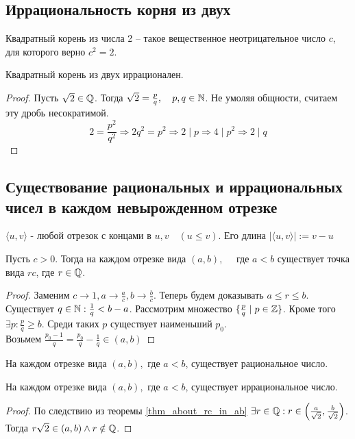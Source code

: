\documentclass[12pt]{report}
\begin{document}
\subsection{Иррациональность корня из двух}\label{ques_5}
\begin{defn}
    Квадратный корень из числа 2 -- такое вещественное неотрицательное число $c$, для которого верно $c^2 = 2$.
\end{defn}
\begin{thm}
    Квадратный корень из двух иррационален.
\end{thm}
\begin{proof}
    Пусть $\sqrt{2} \in  \mathbb{Q}$. Тогда $ \sqrt{2} = \frac{p}{q}, \quad p, q \in \mathbb{N}$. Не умоляя общности, считаем эту дробь несократимой. \\
    $$2 = \frac{p^2}{q^2} \Rightarrow 2 q^2 = p^2 \Rightarrow 2 \mid p \Rightarrow 4 \mid p^2 \Rightarrow 2 \mid q$$
\end{proof}
\subsection{Существование рациональных и иррациональных чисел в каждом невырожденном отрезке}\label{ques_6}
\begin{defn}
    $\langle u, v \rangle $ - любой отрезок с концами в $u, v\quad (u \le v)$. Его длина $|\langle u, v \rangle | := v-u$
\end{defn}
\begin{thm}\label{thm_about_rc_in_ab}
    Пусть $c > 0$. Тогда на каждом отрезке вида $(a, b), \quad \mbox{ где } a < b$ существует точка вида $rc$, где  $r \in \mathbb{Q}$.
\end{thm}
\begin{proof}
    Заменим $c \to 1, a \to \frac{a}{c} , b \to \frac{b}{c}$. Теперь будем доказывать ${a}\le r \le {b}$.
    Существует $q \in \mathbb{N}: \frac{1}{q}<b-a$. Рассмотрим множество $\{\frac{p}{q}\mid p \in \mathbb{Z}\}$. Кроме того $ \exists p: \frac{p}{q} \ge b$. Среди таких $p$ существует наименьший $p_0$.\\
    Возьмем $\frac{p_0-1}{q} = \frac{p_0}{q} - \frac{1}{q} \in ( a, b )$
\end{proof}
\begin{cor}
    На каждом отрезке вида $(a, b),  \mbox{ где } a < b$, существует рациональное число.
\end{cor}
\begin{thm}
    На каждом отрезке вида $(a, b),  \mbox{ где } a < b$, существует иррациональное число.
\end{thm}
\begin{proof}
    По следствию из теоремы \ref{thm_about_rc_in_ab} $\exists r \in  \mathbb{Q}: r \in \left ( \frac{a}{\sqrt{2}}, \frac{b}{\sqrt{2}} \right )$. Тогда $r \sqrt{2} \in (a, b) \wedge r \notin \mathbb{Q}$.
\end{proof}
\end{document}

